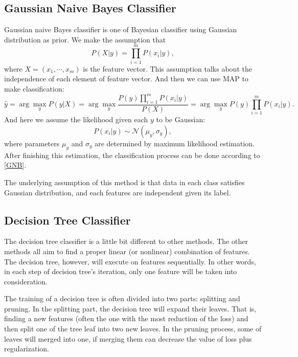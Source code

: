 \documentclass[english]{article}
\begin{document}
\subsection{Gaussian Naive Bayes Classifier}
\par Gaussian naive Bayes classifier is one of Bayesian classifier using Gaussian distribution as prior. We make the assumption that
\begin{equation}
	P(X|y) = \prod_{i=1}^{m}P(x_{i}|y),
\end{equation}
where $X = (x_{1}, \cdots, x_{m})$ is the feature vector. This assumption talks about the independence of each element of feature vector. And then we can use MAP to make classification:
\begin{equation}\label{GNB}
	\hat{y} = \arg\max_{y}P(y|X) = \arg\max_{y}\frac{P(y)\prod_{i=1}^{m}P(x_{i}|y)}{P(X)} = \arg\max_{y}P(y)\prod_{i=1}^{m}P(x_{i}|y).
\end{equation}
And here we assume the likelihood given each $y$ to be Gaussian:
\begin{equation}
	P(x_{i}|y)\sim\mathcal{N}(\mu_{y}, \sigma_{y}),
\end{equation}
where parameters $\mu_{y}$ and $\sigma_{y}$ are determined by maximum likelihood estimation. After finishing this estimation, the classification process can be done according to \eqref{GNB}.
\par The underlying assumption of this method is that data in each class satisfies Gaussian distribution, and each features are independent given its label.

\subsection{Decision Tree Classifier}
\par The decision tree classifier is a little bit different to other methods. The other methods all aim to find a proper linear (or nonlinear) combination of features. The decision tree, however, will execute on features sequentially. In other words, in each step of decision tree's iteration, only one feature will be taken into consideration.
\par The training of a decision tree is often divided into two parts: splitting and pruning. In the splitting part, the decision tree will expand their leaves. That is, finding a new features (often the one with the most reduction of the loss) and then split one of the tree leaf into two new leaves. In the pruning process, some of leaves will merged into one, if merging them can decrease the value of loss plus regularization.
\end{document}
